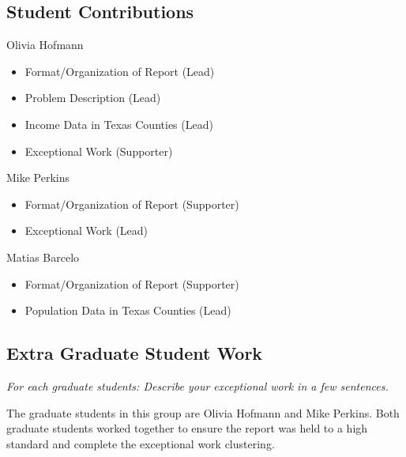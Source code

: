 \documentclass[
]{article}
\providecommand{\tightlist}{%
  \setlength{\itemsep}{0pt}\setlength{\parskip}{0pt}}
\begin{document}
\subsection{Student Contributions}\label{student-contributions}

Olivia Hofmann

\begin{itemize}
\tightlist
\item
  Format/Organization of Report (Lead)
\item
  Problem Description (Lead)
\item
  Income Data in Texas Counties (Lead)
\item
  Exceptional Work (Supporter)
\end{itemize}

Mike Perkins

\begin{itemize}
\tightlist
\item
  Format/Organization of Report (Supporter)
\item
  Exceptional Work (Lead)
\end{itemize}

Matias Barcelo

\begin{itemize}
\tightlist
\item
  Format/Organization of Report (Supporter)
\item
  Population Data in Texas Counties (Lead)
\end{itemize}

\subsection{Extra Graduate Student
Work}\label{extra-graduate-student-work}

\emph{For each graduate students: Describe your exceptional work in a
few sentences.}

The graduate students in this group are Olivia Hofmann and Mike Perkins.
Both graduate students worked together to ensure the report was held to
a high standard and complete the exceptional work clustering.
\end{document}

